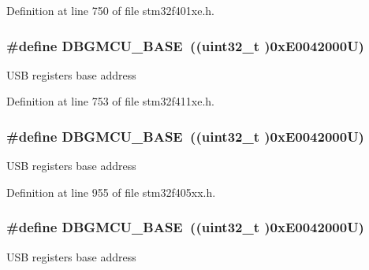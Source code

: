 Definition at line 750 of file stm32f401xe.\+h.

\subsubsection[{\texorpdfstring{D\+B\+G\+M\+C\+U\+\_\+\+B\+A\+SE}{DBGMCU_BASE}}]{\setlength{\rightskip}{0pt plus 5cm}\#define D\+B\+G\+M\+C\+U\+\_\+\+B\+A\+SE~((uint32\+\_\+t )0x\+E0042000\+U)}\hypertarget{group___peripheral__registers__structures_ga4adaf4fd82ccc3a538f1f27a70cdbbef}{}\label{group___peripheral__registers__structures_ga4adaf4fd82ccc3a538f1f27a70cdbbef}
U\+SB registers base address 

Definition at line 753 of file stm32f411xe.\+h.

\subsubsection[{\texorpdfstring{D\+B\+G\+M\+C\+U\+\_\+\+B\+A\+SE}{DBGMCU_BASE}}]{\setlength{\rightskip}{0pt plus 5cm}\#define D\+B\+G\+M\+C\+U\+\_\+\+B\+A\+SE~((uint32\+\_\+t )0x\+E0042000\+U)}\hypertarget{group___peripheral__registers__structures_ga4adaf4fd82ccc3a538f1f27a70cdbbef}{}\label{group___peripheral__registers__structures_ga4adaf4fd82ccc3a538f1f27a70cdbbef}
U\+SB registers base address 

Definition at line 955 of file stm32f405xx.\+h.

\subsubsection[{\texorpdfstring{D\+B\+G\+M\+C\+U\+\_\+\+B\+A\+SE}{DBGMCU_BASE}}]{\setlength{\rightskip}{0pt plus 5cm}\#define D\+B\+G\+M\+C\+U\+\_\+\+B\+A\+SE~((uint32\+\_\+t )0x\+E0042000\+U)}\hypertarget{group___peripheral__registers__structures_ga4adaf4fd82ccc3a538f1f27a70cdbbef}{}\label{group___peripheral__registers__structures_ga4adaf4fd82ccc3a538f1f27a70cdbbef}
U\+SB registers base address 

